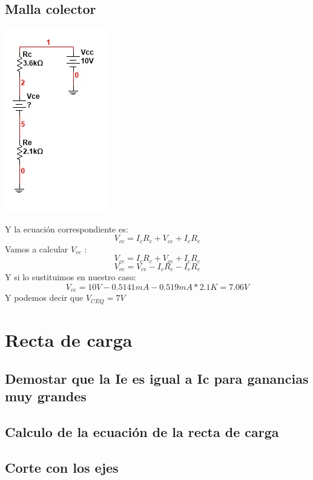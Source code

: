 \documentclass[10pt,a4paper]{article}
\begin{document}
\subsection{Malla colector}
\begin{center}
\includegraphics[scale=1]{Images/Imagen7.jpg}
\end{center}
Y la ecuación correspondiente es:
\begin{equation}
V_{cc}=I_{c}R_{c}+V_{ce}+I_{e}R_{e}
\end{equation}
Vamos a calcular $V_{ce}$ :
\[V_{cc}=I_{c}R_{c}+V_{ce}+I_{e}R_{e}\]
\[V_{ce}= V_{cc}-I_{c}R_{c}-I_{e}R_{e}\]
Y si lo sustituimos en nuestro caso:
\[V_{ce}= 10V-0.5141mA-0.519mA*2.1K= 7.06V\]
Y podemos decir que $V_{CEQ}=7V$
\section{Recta de carga}
\subsection{Demostar que la Ie es igual a Ic para ganancias muy grandes}
\subsection{Calculo de la ecuación de la recta de carga}
\subsection{Corte con los ejes}
\end{document}
